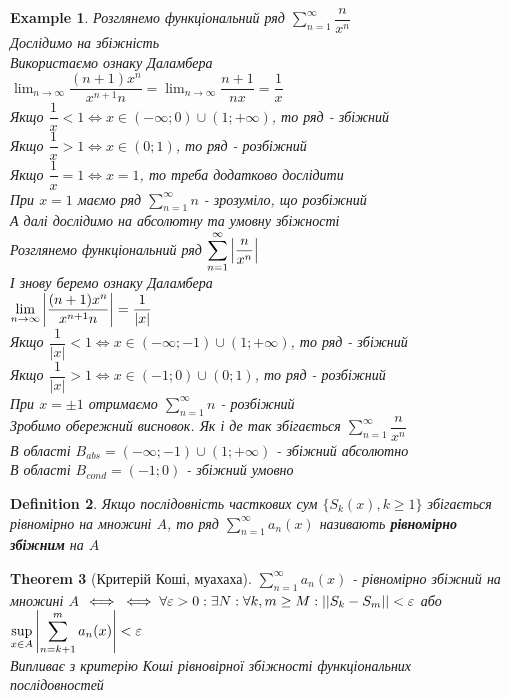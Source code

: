 \documentclass[a4paper, 14pt]{extarticle}
\def\huge{\displaystyle}
\def\bigline{\vspace{5mm}\\}
\theoremstyle{theoremdd}
\newtheorem{theorem}{Theorem}[subsection]
\theoremstyle{theoremdd}
\newtheorem{definition}[theorem]{Definition}
\theoremstyle{theoremdd}
\theoremstyle{theoremdd}
\newtheorem{example}[theorem]{Example}
\theoremstyle{theoremdd}
\theoremstyle{theoremdd}
\theoremstyle{theoremdd}
\theoremstyle{theoremdd}
\begin{document}
\begin{example}
Розглянемо функціональний ряд $\huge\sum_{n=1}^\infty \dfrac{n}{x^n}$\\
Дослідимо на збіжність\\
Використаємо ознаку Даламбера\\
$\huge\lim_{n \to \infty} \dfrac{(n+1) x^n}{x^{n+1} n} = \lim_{n \to \infty} \dfrac{n+1}{nx} = \dfrac{1}{x}$\\
Якщо $\dfrac{1}{x} < 1 \iff x \in (-\infty;0) \cup (1;+\infty)$, то ряд - збіжний\\
Якщо $\dfrac{1}{x} > 1 \iff x \in (0;1)$, то ряд - розбіжний\\
Якщо $\dfrac{1}{x} = 1 \iff x = 1$, то треба додатково дослідити\\
При $x = 1$ маємо ряд $\huge\sum_{n=1}^\infty n$ - зрозуміло, що розбіжний
\bigline
А далі дослідимо на абсолютну та умовну збіжності\\
Розглянемо функціональний ряд $\huge\sum_{n=1}^\infty \abs{\dfrac{n}{x^n}}$\\
І знову беремо ознаку Даламбера\\
$\huge\lim_{n \to \infty} \abs{\dfrac{(n+1) x^n}{x^{n+1} n}} = \dfrac{1}{|x|}$\\
Якщо $\dfrac{1}{|x|} < 1 \iff x \in (-\infty;-1) \cup (1;+\infty)$, то ряд - збіжний\\
Якщо $\dfrac{1}{|x|} > 1 \iff x \in (-1;0) \cup (0;1)$, то ряд - розбіжний\\
При $x = \pm 1$ отримаємо $\huge\sum_{n=1}^\infty n$ - розбіжний
\bigline
Зробимо обережний висновок. Як і де так збігається $\huge\sum_{n=1}^\infty \dfrac{n}{x^n}$\\
В області $B_{abs} = (-\infty;-1) \cup (1;+\infty)$ - збіжний абсолютно\\
В області $B_{cond} = (-1;0)$ - збіжний умовно
\bigline
\end{example}

\begin{definition}
Якщо послідовність часткових сум $\{S_k(x), k \geq 1\}$ збігається рівномірно на множині $A$, то ряд $\huge \sum_{n=1}^\infty a_n(x)$ називають \textbf{рівномірно збіжним} на $A$\\
\end{definition}

\begin{theorem}[Критерій Коші, муахаха]
$\huge \sum_{n=1}^\infty a_n(x)$ - рівномірно збіжний на множині $A$ $\iff \\ \iff \forall \varepsilon > 0: \exists N: \forall k,m \geq M: ||S_k - S_m|| < \varepsilon$ або $\huge \sup_{x \in A} \abs{\sum_{n=k+1}^m a_n(x)} < \varepsilon$\\
\textit{Випливає з критерію Коші рівновірної збіжності функціональних \\ послідовностей}
\end{theorem}
\end{document}
